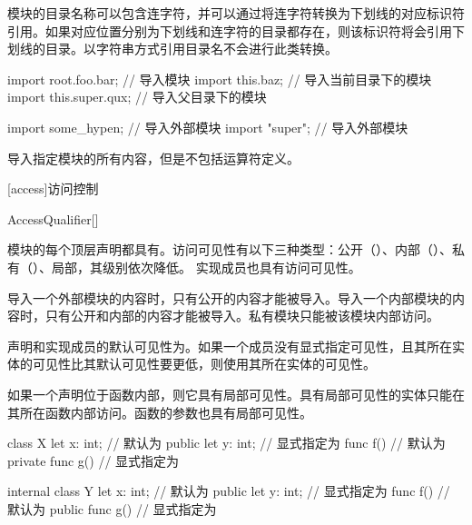 \pnum
模块的目录名称可以包含连字符，并可以通过将连字符转换为下划线的对应标识符引用。如果对应位置分别为下划线和连字符的目录都存在，则该标识符将会引用下划线的目录。以字符串方式引用目录名不会进行此类转换。

\enterexample
\begin{codeblock}
import root.foo.bar; // 导入模块
import this.baz; // 导入当前目录下的模块
import this.super.qux; // 导入父目录下的模块

import some_hypen; // 导入外部模块
import "super"; // 导入外部模块
\end{codeblock}
\exitexample

\pnum
\tcode{*}导入指定模块的所有内容，但是不包括运算符定义。

[access]{访问控制}

\begin{bnf}{AccessQualifier}[\oneof]
\end{bnf}

\pnum
模块的每个顶层声明都具有。访问可见性有以下三种类型：公开（）、内部（）、私有（）、局部，其级别依次降低。
实现成员也具有访问可见性。

\pnum
导入一个外部模块的内容时，只有公开的内容才能被导入。导入一个内部模块的内容时，只有公开和内部的内容才能被导入。私有模块只能被该模块内部访问。

\pnum
声明和实现成员的默认可见性为。如果一个成员没有显式指定可见性，且其所在实体的可见性比其默认可见性要更低，则使用其所在实体的可见性。

\pnum
如果一个声明位于函数内部，则它具有局部可见性。具有局部可见性的实体只能在其所在函数内部访问。函数的参数也具有局部可见性。

\enterexample
\begin{codeblock}
class X {
    let x: int; // 默认为
    public let y: int; // 显式指定为
    func f() {} // 默认为
    private func g() {} // 显式指定为
}

internal class Y {
    let x: int; // 默认为
    public let y: int; // 显式指定为
    func f() {} // 默认为
    public func g() {} // 显式指定为
}
\end{codeblock}
